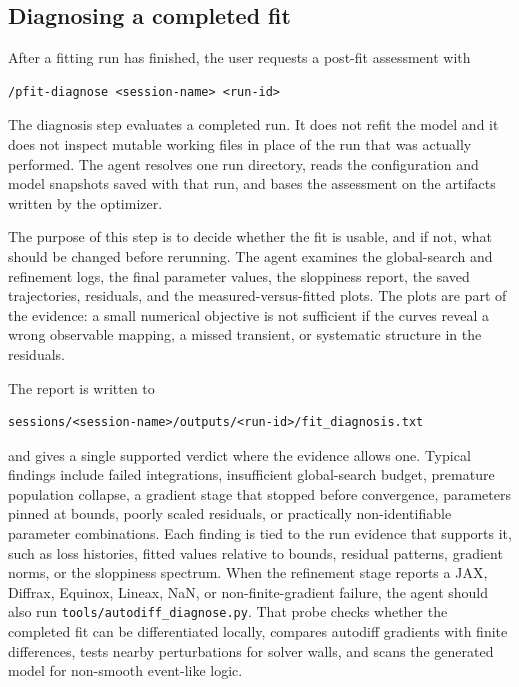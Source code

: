 \subsection{Diagnosing a completed fit}
\label{sec:pfit-diagnose}

After a fitting run has finished, the user requests a post-fit assessment with

\begin{verbatim}
/pfit-diagnose <session-name> <run-id>
\end{verbatim}

The diagnosis step evaluates a completed run. It does not refit the model and
it does not inspect mutable working files in place of the run that was actually
performed. The agent resolves one run directory, reads the configuration and
model snapshots saved with that run, and bases the assessment on the artifacts
written by the optimizer.

The purpose of this step is to decide whether the fit is usable, and if not,
what should be changed before rerunning. The agent examines the global-search
and refinement logs, the final parameter values, the sloppiness report, the
saved trajectories, residuals, and the measured-versus-fitted plots. The plots
are part of the evidence: a small numerical objective is not sufficient if the
curves reveal a wrong observable mapping, a missed transient, or systematic
structure in the residuals.

The report is written to

\begin{verbatim}
sessions/<session-name>/outputs/<run-id>/fit_diagnosis.txt
\end{verbatim}

and gives a single supported verdict where the evidence allows one. Typical
findings include failed integrations, insufficient global-search budget,
premature population collapse, a gradient stage that stopped before convergence,
parameters pinned at bounds, poorly scaled residuals, or practically
non-identifiable parameter combinations. Each finding is tied to the run
evidence that supports it, such as loss histories, fitted values relative to
bounds, residual patterns, gradient norms, or the sloppiness spectrum.
When the refinement stage reports a JAX, Diffrax, Equinox, Lineax, NaN, or
non-finite-gradient failure, the agent should also run
\texttt{tools/autodiff\_diagnose.py}. That probe checks whether the completed
fit can be differentiated locally, compares autodiff gradients with finite
differences, tests nearby perturbations for solver walls, and scans the
generated model for non-smooth event-like logic.

